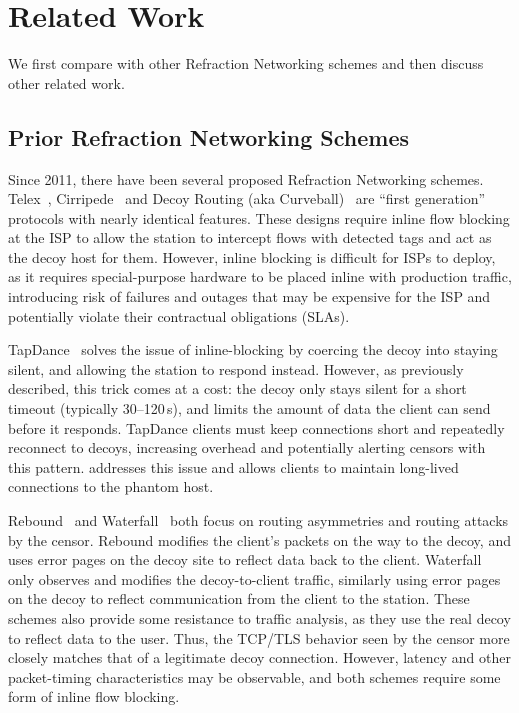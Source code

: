 \TabCompare

\section{Related Work}

We first compare \scheme with other Refraction Networking schemes and then discuss other related work.

\subsection{Prior Refraction Networking Schemes}

Since 2011, there have been several proposed Refraction Networking schemes.
Telex~\cite{telex11}, Cirripede~\cite{cirripede11} and Decoy
Routing (aka Curveball)~\cite{curveball11} are ``first generation'' protocols with nearly
identical features. These designs require inline flow blocking at the ISP to
allow the station to intercept flows with detected tags and act as the decoy
host for them. However, inline blocking is difficult for ISPs to deploy, as it
requires special-purpose hardware to be placed inline with production traffic,
introducing risk of failures and outages that may be expensive for the ISP
and potentially violate their contractual obligations (SLAs).

TapDance~\cite{tapdance14} solves the issue of inline-blocking by coercing the
decoy into staying silent, and allowing the station to respond instead. However,
as previously described, this trick comes at a cost: the decoy only stays silent
for a short timeout (typically 30--120\,s), and limits the amount of data
the client can send before it responds. TapDance clients must keep connections
short and repeatedly reconnect to decoys, increasing overhead and potentially
alerting censors with this pattern. \scheme addresses this issue and allows
clients to maintain long-lived connections to the phantom host.

Rebound~\cite{rebound15} and Waterfall~\cite{waterfall17} both focus on routing
asymmetries and routing attacks by the censor. Rebound modifies the client's
packets on the way to the decoy, and uses error pages on the decoy site to
reflect data back to the client. Waterfall only observes and modifies the
decoy-to-client traffic, similarly using error pages on the decoy to reflect
communication from the client to the station. These schemes also provide some
resistance to traffic analysis, as they use the real decoy to reflect data to
the user. Thus, the TCP/TLS behavior seen by the censor more closely matches
that of a legitimate decoy connection. However, latency and other packet-timing
characteristics may be observable, and both schemes require some form of inline
flow blocking.

